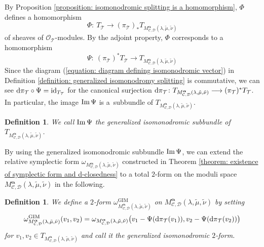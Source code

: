 \documentclass[pdftex]{sigma}
\numberwithin{equation}{section}
\newtheorem{Definition}[Theorem]{Definition}
\newcommand\im{\mathop{\rm Im}\nolimits}
\newcommand{\balpha}{\boldsymbol \alpha}
\begin{document}
By Proposition \ref{proposition: isomonodromic splitting is a homomorphism},
$\Phi$ defines a homomorphism
\[
 \Phi\colon \
 T_{\mathcal T} \longrightarrow
 (\pi_{\mathcal T})_*
 T_{M^{\balpha}_{{\mathcal C},{\mathcal D}}(\lambda,\tilde{\mu},\tilde{\nu})}
\]
of sheaves of ${\mathcal O}_{\mathcal T}$-modules.
By the adjoint property, $\Phi$ corresponds to a
homomorphism
\begin{equation} \label{equation: generalized isomonodromic splitting homomorphism}
 \Psi \colon \
 (\pi_{\mathcal T})^* T_{\mathcal T}
 \longrightarrow
 T_{M^{\balpha}_{{\mathcal C},{\mathcal D}}(\lambda,\tilde{\mu},\tilde{\nu})}
\end{equation}
Since the diagram (\ref{equation: diagram defining isomonodromic vector})
in Definition \ref{definition: generalized isomonodromy splitting} is commutative,
we can see
${\rm d}\pi_{\mathcal T}\circ\Psi=\mathrm{id}_{T_{\mathcal T}}$
for the canonical surjection
${\rm d}\pi_{\mathcal T} \colon
T_{M^{\balpha}_{{\mathcal C},{\mathcal D}}(\lambda,\tilde{\mu},\tilde{\nu})}
\longrightarrow
(\pi_{\mathcal T})^* T_{\mathcal T}$.
In particular,
the image
$\im \Psi$ is a~subbundle of
$T_{M^{\balpha}_{{\mathcal C},{\mathcal D}}(\lambda,\tilde{\mu},\tilde{\nu})}$.

\begin{Definition}\label{definition: generalized isomonodromic subbundle}
We call $\im\Psi$ the
generalized isomonodromic subbundle of
$T_{M^{\balpha}_{{\mathcal C},{\mathcal D}}(\lambda,\tilde{\mu},\tilde{\nu})}$.
\end{Definition}

By using the generalized isomonodromic subbundle $\im\Psi$,
we can extend the relative symplectic form
$\omega_{M^{\balpha}_{{\mathcal C},{\mathcal D}}(\lambda,\tilde{\mu},\tilde{\nu})}$
constructed in Theorem \ref{theorem: existence of symplectic form and d-closedness}
to a total $2$-form on the moduli space
$M^{\balpha}_{{\mathcal C},{\mathcal D}}(\lambda,\tilde{\mu},\tilde{\nu})$
in the following.

\begin{Definition}\label{definition: generalized isomonodromic 2-form}
We define a $2$-form
$\omega_{M^{\balpha}_{{\mathcal C},{\mathcal D}}(\lambda,\tilde{\mu},\tilde{\nu})}^{\mathrm{GIM}}$
on $M^{\balpha}_{{\mathcal C},{\mathcal D}}(\lambda,\tilde{\mu},\tilde{\nu})$
by setting
\[
 \omega_{M^{\balpha}_{{\mathcal C},{\mathcal D}}(\lambda,\tilde{\mu},\tilde{\nu})}^{\mathrm{GIM}}
 (v_1,v_2)
 =
 \omega_{M^{\balpha}_{{\mathcal C},{\mathcal D}}(\lambda,\tilde{\mu},\tilde{\nu})}
 \big(v_1-\Psi({\rm d}\pi_{\mathcal T}(v_1)), v_2-\Psi({\rm d}\pi_{\mathcal T}(v_2))\big)
\]
for $v_1,v_2\in
T_{M^{\balpha}_{{\mathcal C},{\mathcal D}}(\lambda,\tilde{\mu},\tilde{\nu})}$
and call it the generalized isomonodromic $2$-form.
\end{Definition}
\end{document}
